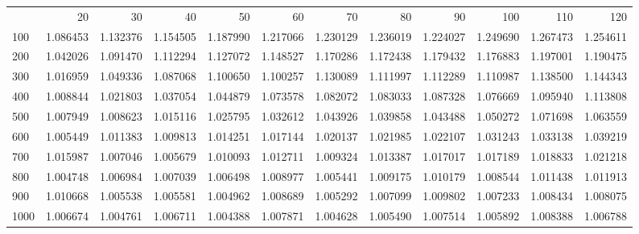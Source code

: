 \begin{tabular}{lrrrrrrrrrrr}
 & 20 & 30 & 40 & 50 & 60 & 70 & 80 & 90 & 100 & 110 & 120 \\
100 & 1.086453 & 1.132376 & 1.154505 & 1.187990 & 1.217066 & 1.230129 & 1.236019 & 1.224027 & 1.249690 & 1.267473 & 1.254611 \\
200 & 1.042026 & 1.091470 & 1.112294 & 1.127072 & 1.148527 & 1.170286 & 1.172438 & 1.179432 & 1.176883 & 1.197001 & 1.190475 \\
300 & 1.016959 & 1.049336 & 1.087068 & 1.100650 & 1.100257 & 1.130089 & 1.111997 & 1.112289 & 1.110987 & 1.138500 & 1.144343 \\
400 & 1.008844 & 1.021803 & 1.037054 & 1.044879 & 1.073578 & 1.082072 & 1.083033 & 1.087328 & 1.076669 & 1.095940 & 1.113808 \\
500 & 1.007949 & 1.008623 & 1.015116 & 1.025795 & 1.032612 & 1.043926 & 1.039858 & 1.043488 & 1.050272 & 1.071698 & 1.063559 \\
600 & 1.005449 & 1.011383 & 1.009813 & 1.014251 & 1.017144 & 1.020137 & 1.021985 & 1.022107 & 1.031243 & 1.033138 & 1.039219 \\
700 & 1.015987 & 1.007046 & 1.005679 & 1.010093 & 1.012711 & 1.009324 & 1.013387 & 1.017017 & 1.017189 & 1.018833 & 1.021218 \\
800 & 1.004748 & 1.006984 & 1.007039 & 1.006498 & 1.008977 & 1.005441 & 1.009175 & 1.010179 & 1.008544 & 1.011438 & 1.011913 \\
900 & 1.010668 & 1.005538 & 1.005581 & 1.004962 & 1.008689 & 1.005292 & 1.007099 & 1.009802 & 1.007233 & 1.008434 & 1.008075 \\
1000 & 1.006674 & 1.004761 & 1.006711 & 1.004388 & 1.007871 & 1.004628 & 1.005490 & 1.007514 & 1.005892 & 1.008388 & 1.006788 \\
\end{tabular}
